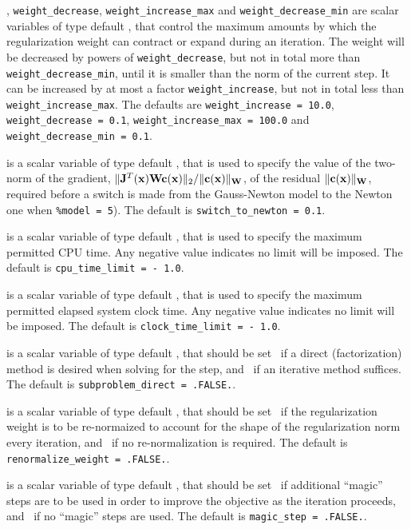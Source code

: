 \documentclass{galahad}
\begin{document}
\begin{description}
,
{\tt weight\_decrease},
{\tt weight\_increase\_max}
and
{\tt weight\_decrease\_min}
are scalar variables of type default \realdp, that
control the maximum amounts by which the regularization weight can
contract or expand during an iteration. The weight will be decreased by
powers of {\tt weight\_decrease}, but not in total
more than  {\tt weight\_decrease\_min}, until it is smaller than the norm of
the current step.
It can be increased by at most a factor {\tt weight\_increase}, but not
in total less than {\tt weight\_increase\_max}.
The defaults are
{\tt weight\_increase = 10.0},
{\tt weight\_decrease = 0.1},
{\tt weight\_incr\-ease\_max = 100.0} and
{\tt weight\_decrease\_min = 0.1}.

 is a scalar variable of type default \realdp,
that is used to specify the value of the two-norm of the gradient,
 $\|{\mathbf{J}}^T({\mathbf{x}}) {\mathbf{W}} {\mathbf{c}}({\mathbf{x}})\|_2/\|{\mathbf{c}}({\mathbf{x}})\|_{{\mathbf{W}}}$,
of the residual  $\|{\mathbf{c}}({\mathbf{x}})\|_{{\mathbf{W}}}$, required before a switch is made
from the Gauss-Newton model to the Newton one when {\tt \%model = 5}).
The default is
{\tt switch\_to\_newton = 0.1}.

 is a scalar variable of type default \realdp,
that is used to specify the maximum permitted CPU time. Any negative
value indicates no limit will be imposed. The default is
{\tt cpu\_time\_limit = - 1.0}.

 is a scalar variable of type default \realdp,
that is used to specify the maximum permitted elapsed system clock time.
Any negative value indicates no limit will be imposed. The default is
{\tt clock\_time\_limit = - 1.0}.

is a scalar variable of type default \logical,
that should be set \true\ if a direct (factorization) method is
desired when solving for the step, and \false\ if an iterative
method suffices.
The default is {\tt subproblem\_direct = .FALSE.}.

is a scalar variable of type default \logical,
that should be set \true\ if the regularization weight is to be
re-normaized to account for the shape of the regularization norm
every iteration, and \false\ if no re-normalization is required.
The default is {\tt renormalize\_weight = .FALSE.}.

is a scalar variable of type default \logical,
that should be set \true\ if additional ``magic'' steps are to be
used in order to improve the objective as the iteration proceeds,
and \false\ if no ``magic'' steps are used.
The default is {\tt magic\_step = .FALSE.}.


\end{description}
\end{document}
